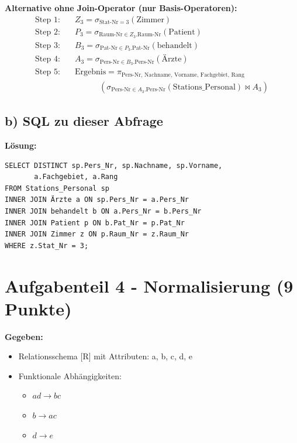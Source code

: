 \documentclass[12pt,a4paper]{article}
\begin{document}
\textbf{Alternative ohne Join-Operator (nur Basis-Operatoren):}
\begin{align*}
\text{Step 1:} & \quad Z_3 = \sigma_{\text{Stat-Nr} = 3} (\text{Zimmer}) \\
\text{Step 2:} & \quad P_3 = \sigma_{\text{Raum-Nr} \in Z_3.\text{Raum-Nr}} (\text{Patient}) \\
\text{Step 3:} & \quad B_3 = \sigma_{\text{Pat-Nr} \in P_3.\text{Pat-Nr}} (\text{behandelt}) \\
\text{Step 4:} & \quad A_3 = \sigma_{\text{Pers-Nr} \in B_3.\text{Pers-Nr}} (\text{Ärzte}) \\
\text{Step 5:} & \quad \text{Ergebnis} = \pi_{\text{Pers-Nr, Nachname, Vorname, Fachgebiet, Rang}} \\
& \quad \quad \quad \quad (\sigma_{\text{Pers-Nr} \in A_3.\text{Pers-Nr}} (\text{Stations\_Personal}) \bowtie A_3)
\end{align*}

\subsection*{b) SQL zu dieser Abfrage}

\textbf{Lösung:}
\begin{verbatim}
SELECT DISTINCT sp.Pers_Nr, sp.Nachname, sp.Vorname, 
       a.Fachgebiet, a.Rang
FROM Stations_Personal sp
INNER JOIN Ärzte a ON sp.Pers_Nr = a.Pers_Nr
INNER JOIN behandelt b ON a.Pers_Nr = b.Pers_Nr
INNER JOIN Patient p ON b.Pat_Nr = p.Pat_Nr
INNER JOIN Zimmer z ON p.Raum_Nr = z.Raum_Nr
WHERE z.Stat_Nr = 3;
\end{verbatim}

\vspace{2cm}

\section*{Aufgabenteil 4 - Normalisierung (9 Punkte)}

\textbf{Gegeben:}
\begin{itemize}
    \item Relationsschema [R] mit Attributen: a, b, c, d, e
    \item Funktionale Abhängigkeiten:
    \begin{itemize}
        \item $ad \to bc$
        \item $b \to ac$
        \item $d \to e$
    \end{itemize}
\end{itemize}
\end{document}
